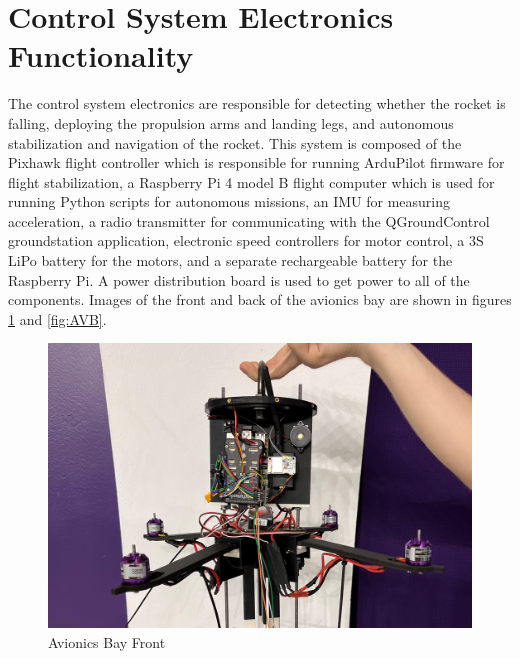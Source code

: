 \section{Control System Electronics Functionality}
The control system electronics are responsible for detecting whether the rocket is falling, deploying the propulsion arms and landing legs, and autonomous stabilization and navigation of the rocket. This system is composed of the Pixhawk flight controller which is responsible for running ArduPilot firmware for flight stabilization, a Raspberry Pi 4 model B flight computer which is used for running Python scripts for autonomous missions, an IMU for measuring acceleration, a radio transmitter for communicating with the QGroundControl groundstation application, electronic speed controllers for motor control, a 3S LiPo battery for the motors, and a separate rechargeable battery for the Raspberry Pi. A power distribution board is used to get power to all of the components. Images of the front and back of the avionics bay are shown in figures \ref{fig:AVF} and \ref{fig:AVB}.

\begin{figure}[H]
    \centering
    \includegraphics[width=\textwidth]{src/figs/AVBay_Front.jpg}
    \caption{Avionics Bay Front}
    \label{fig:AVF}
\end{figure}

